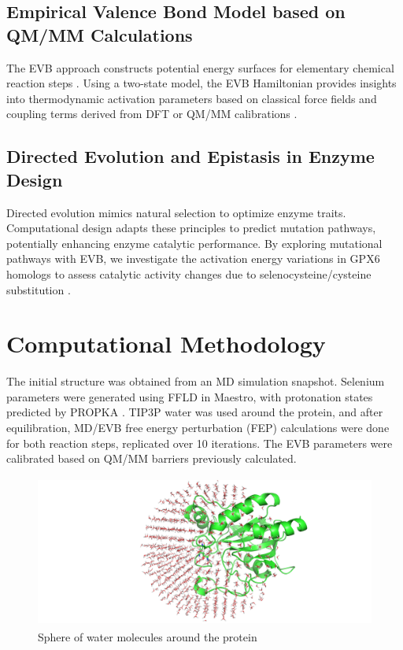 \documentclass[journal=jacsat,manuscript=article]{achemso}
\begin{document}
\subsection{Empirical Valence Bond Model based on QM/MM Calculations}

The EVB approach constructs potential energy surfaces for elementary chemical reaction steps \cite{Oanca2024}. Using a two-state model, the EVB Hamiltonian provides insights into thermodynamic activation parameters based on classical force fields and coupling terms derived from DFT or QM/MM calibrations \cite{Oanca2023}.

\subsection{Directed Evolution and Epistasis in Enzyme Design}

Directed evolution mimics natural selection to optimize enzyme traits. Computational design adapts these principles to predict mutation pathways, potentially enhancing enzyme catalytic performance. By exploring mutational pathways with EVB, we investigate the activation energy variations in GPX6 homologs to assess catalytic activity changes due to selenocysteine/cysteine substitution \cite{Starr2016, Storz2018}.

\section{Computational Methodology}

The initial structure was obtained from an MD simulation snapshot. Selenium parameters were generated using FFLD in Maestro, with protonation states predicted by PROPKA \cite{Søndergaard2011}. TIP3P water was used around the protein, and after equilibration, MD/EVB free energy perturbation (FEP) calculations were done for both reaction steps, replicated over 10 iterations. The EVB parameters were calibrated based on QM/MM barriers previously calculated.

\begin{figure}
\begin{center}
\includegraphics[width=0.7\linewidth, height=5cm]{figures/solvent_sphere.png} 
\end{center}
\caption{Sphere of water molecules around the protein}
\label{fig:figure6}
\end{figure}

\medskip



\end{document}
